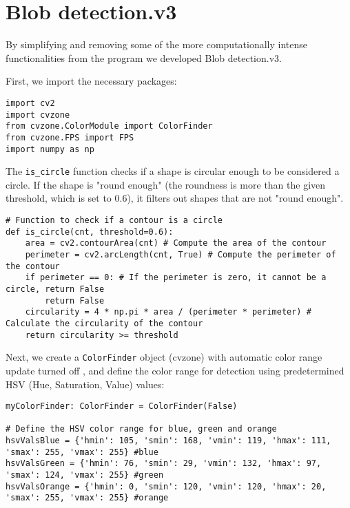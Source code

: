 \section{Blob detection.v3}
By simplifying and
removing some of the more computationally intense functionalities from the program we developed Blob detection.v3.

First, we import the necessary packages:
\begin{lstlisting}[language=PythonPlus]
import cv2
import cvzone
from cvzone.ColorModule import ColorFinder
from cvzone.FPS import FPS
import numpy as np
\end{lstlisting}

The \verb|is_circle| function checks if a shape is circular enough to be considered a circle. If the shape is "round enough" (the roundness is more than the given threshold, which is set to 0.6), it filters out shapes that are not "round enough".
\begin{lstlisting}[language=PythonPlus]
# Function to check if a contour is a circle
def is_circle(cnt, threshold=0.6):
    area = cv2.contourArea(cnt) # Compute the area of the contour
    perimeter = cv2.arcLength(cnt, True) # Compute the perimeter of the contour
    if perimeter == 0: # If the perimeter is zero, it cannot be a circle, return False
        return False
    circularity = 4 * np.pi * area / (perimeter * perimeter) # Calculate the circularity of the contour
    return circularity >= threshold
\end{lstlisting}


Next, we create a \verb|ColorFinder| object (cvzone) with automatic color range update turned off \cite{CVzoneDoc}, and define the color range for detection using predetermined HSV (Hue, Saturation, Value) values:
\begin{lstlisting}[language=PythonPlus]
myColorFinder: ColorFinder = ColorFinder(False)

# Define the HSV color range for blue, green and orange
hsvValsBlue = {'hmin': 105, 'smin': 168, 'vmin': 119, 'hmax': 111, 'smax': 255, 'vmax': 255} #blue
hsvValsGreen = {'hmin': 76, 'smin': 29, 'vmin': 132, 'hmax': 97, 'smax': 124, 'vmax': 255} #green
hsvValsOrange = {'hmin': 0, 'smin': 120, 'vmin': 120, 'hmax': 20, 'smax': 255, 'vmax': 255} #orange
\end{lstlisting}

